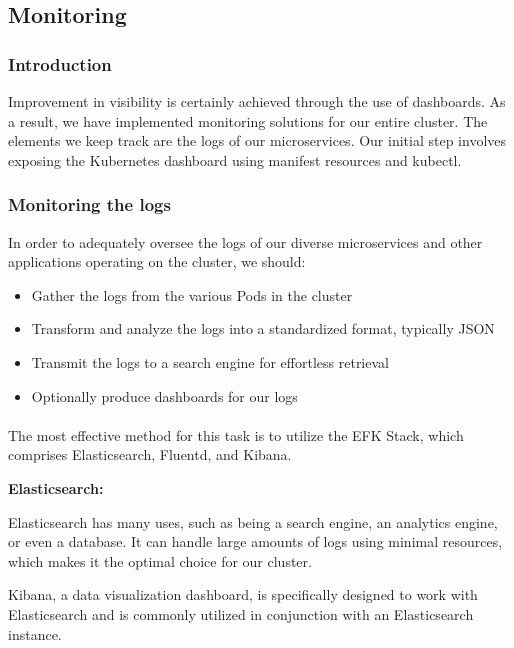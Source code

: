 \subsection{Monitoring}
\subsubsection{Introduction}
Improvement in visibility is certainly achieved through the use of dashboards. As a result, we have implemented monitoring solutions for our entire cluster. The elements we keep track are the logs of our microservices. Our initial step involves exposing the Kubernetes dashboard using manifest resources and kubectl.

\subsubsection{Monitoring the logs}

In order to adequately oversee the logs of our diverse microservices and other applications operating on the cluster, we should:

\begin{itemize}
  \item Gather the logs from the various Pods in the cluster
  \item Transform and analyze the logs into a standardized format, typically JSON
  \item Transmit the logs to a search engine for effortless retrieval
  \item Optionally produce dashboards for our logs

\end{itemize}

\paragraph{}
The most effective method for this task is to utilize the EFK Stack, which comprises Elasticsearch, Fluentd, and Kibana.

\textbf{Elasticsearch:}

Elasticsearch has many uses, such as being a search engine, an analytics engine, or even a database. It can handle large amounts of logs using minimal resources, which makes it the optimal choice for our cluster.


Kibana, a data visualization dashboard, is specifically designed to work with Elasticsearch and is commonly utilized in conjunction with an Elasticsearch instance.



